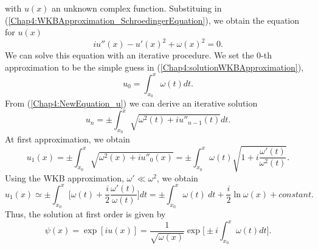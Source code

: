 \documentclass[11pt,a4paper,twoside]{book}
\begin{document}
with  $ u(x) $ an unknown complex function. Substituing in (\ref{Chap4:WKBApproximation_SchroedingerEquation}), we obtain the equation for $ u(x) $
\begin{equation}
	\label{Chap4:NewEquation_u}
	iu''(x) - u'(x)^{2} + \omega(x)^{2} = 0.
\end{equation}
We can solve this equation with an iterative procedure. We set the $ 0 $-th approximation to be the simple guess in (\ref{Chap4:solutionWKBApproximation}),
\begin{equation}
	u_{0}=\int_{x_{0}}^{x} \omega(t) dt.
\end{equation}
From (\ref{Chap4:NewEquation_u}) we can derive an iterative solution
\begin{equation}
u_{n} = \pm \int_{x_{0}}^{x}\sqrt{\omega^{2}(t) + iu''_{n-1}(t)}dt.
\end{equation}
At first approximation, we obtain
\begin{equation}
	\label{Chap4:WKB_u1}
	u_{1}(x) = \pm \int_{x_{0}}^{x} \sqrt{\omega^{2}(x) + iu''_{0}(x)} = \pm \int_{x_{0}}^{x} \omega(t) \sqrt{1+i\frac{\omega'(t)}{\omega^{2}(t)}}.
\end{equation}
Using the WKB approximation, $ \omega'\ll \omega^{2} $, we obtain
\begin{equation}
u_{1}(x)\simeq \pm \int_{x_{0}}^{x} \Bigg[  \omega(t) + \frac{i}{2}\frac{\omega'(t)}{\omega(t)}\Bigg]dt =
 \pm \int_{x_{0}}^{x} \omega(t)\ dt + \frac{i}{2} \ln \omega(x) + constant.
\end{equation}
Thus, the solution at first order is given by
\begin{equation}
\label{Chap4:Chap4:WKBFinalSolution}
\psi(x)=\exp[iu(x)]=\frac{1}{\sqrt{\omega(x)}}\exp \Bigg[\pm i\int_{x_0}^{x}\omega(t)dt\Bigg].
\end{equation}
\end{document}
